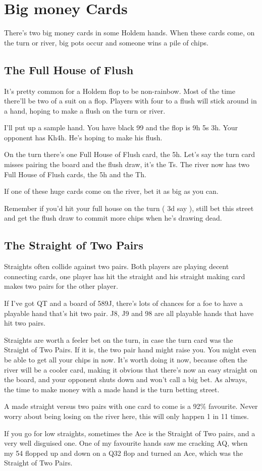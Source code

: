 \chapter{Big money Cards}


There's two big money cards in some Holdem hands. When these cards come,
on the turn or river, big pots occur and someone wins a pile of chips.

\section{The Full House of Flush}

It's pretty common for a Holdem flop to be non-rainbow. Most of the time
there'll be two of a suit on a flop. Players with four to a flush will
stick around in a hand, hoping to make a flush on the turn or river.

I'll put up a sample hand. You have black 99 and the flop is
9h 5s 3h. Your opponent has Kh4h. He's hoping to make his flush.

On the turn there's one Full House of Flush card, the 5h. Let's say
the turn card misses pairing the board and the flush draw, it's
the Ts. The river now has two Full House of Flush cards, the 5h and
the Th.

If one of these huge cards come on the river, bet it as big as you can.

Remember if you'd hit your full house on the turn ( 3d say ), still bet
this street and get the flush draw to commit more chips when he's drawing
dead.

\section{The Straight of Two Pairs}

Straights often collide against two pairs. Both players are playing
decent connecting cards, one player has hit the straight and his straight
making card makes two pairs for the other player.

If I've got QT and a board of 589J, there's lots of chances for a foe
to have a playable hand that's hit two pair. J8, J9 and 98 are all playable
hands that have hit two pairs.

Straights are worth a feeler bet on the turn, in case the turn card was
the Straight of Two Pairs. If it is, the two pair hand might raise
you. You might even be able to get all your chips
in now. It's worth doing it now, because often the river will be a cooler
card, making it obvious that there's now an easy straight on the board,
and your opponent shuts down and won't call a big bet. As always, the
time to make money with a made hand is the turn betting street.

A made straight versus two pairs with one card to come is a 92\% favourite.
Never worry about being losing on the river here, this will only happen
1 in 11 times.

If you go for low straights, sometimes the Ace is the Straight of Two pairs,
and a very well disguised one. One of my favourite hands saw me
cracking AQ, when my 54 flopped up and down on a Q32 flop and turned
an Ace, which was the Straight of Two Pairs.
